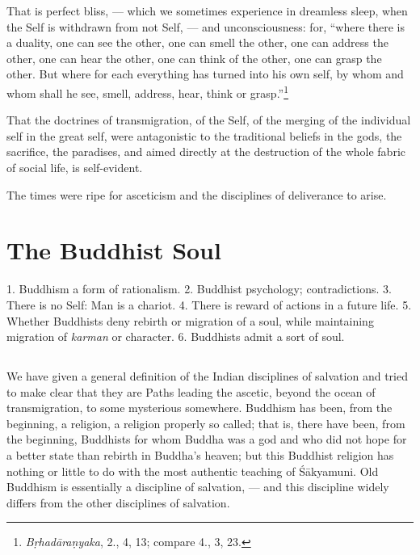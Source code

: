 \documentclass[a4paper, 11pt, oneside, english]{article}
\begin{document}
That is perfect bliss, --- which we sometimes experience in dreamless sleep, when the Self is withdrawn from not Self, --- and unconsciousness: for, ``where there is a duality, one can see the other, one can smell the other, one can address the other, one can hear the other, one can think of the other, one can grasp the other. But where for each everything has turned into his own self, by whom and whom shall he see, smell, address, hear, think or grasp.''\footnote{\emph{Bṛhadāraṇyaka}, 2., 4, 13; compare 4., 3, 23.}

That the doctrines of transmigration, of the Self, of the merging of the individual self in the great self, were antagonistic to the traditional beliefs in the gods, the sacrifice, the paradises, and aimed directly at the destruction of the whole fabric of social life, is self-evident.

The times were ripe for asceticism and the disciplines of deliverance to arise.
\clearpage
\section{The Buddhist Soul}
\begin{center}\footnotesize
1. Buddhism a form of rationalism. 2. Buddhist psychology; contradictions. 3. There is no Self: Man is a chariot. 4. There is reward of actions in a future life. 5. Whether Buddhists deny rebirth or migration of a soul, while maintaining migration of \emph{karman} or character. 6. Buddhists admit a sort of soul.
\end{center}
\subsection{}
\paragraph{}
We have given a general definition of the Indian disciplines of salvation and tried to make clear that they are Paths leading the ascetic, beyond the ocean of transmigration, to some mysterious somewhere. Buddhism has been, from the beginning, a religion, a religion properly so called; that is, there have been, from the beginning, Buddhists for whom Buddha was a god and who did not hope for a better state than rebirth in Buddha's heaven; but this Buddhist religion has nothing or little to do with the most authentic teaching of Śākyamuni. Old Buddhism is essentially a discipline of salvation, --- and this discipline widely differs from the other disciplines of salvation.
\end{document}
